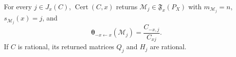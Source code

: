 For every \(j\in J_x(C)\), \(\operatorname{Cert}(C,x)\) returns \(\mathcal M_j\in\mathfrak F_x(P_X)\) with \(m_{\mathcal M_j}=n\), \(s_{\mathcal M_j}(x)=j\), and
\[
 \boldsymbol\theta_{-x\leftarrow x}(\mathcal M_j)=\frac{C_{-x,j}}{C_{xj}}.
\]
If \(C\) is rational, its returned matrices \(Q_j\) and \(H_j\) are rational.